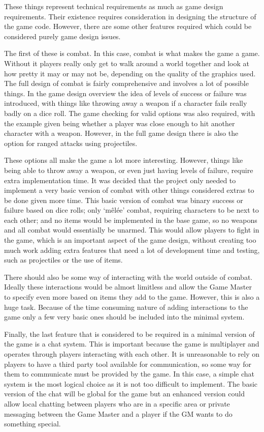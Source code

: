 These things represent technical requirements as much as game design requirements. Their existence requires consideration in designing the structure of the game code. However, there are some other features required which could be considered purely game design issues.

The first of these is combat. In this case, combat is what makes the game a game. Without it players really only get to walk around a world together and look at how pretty it may or may not be, depending on the quality of the graphics used. The full design of combat is fairly comprehensive and involves a lot of possible things. In the game design overview the idea of levels of success or failure was introduced, with things like throwing away a weapon if a character fails really badly on a dice roll. The game checking for valid options was also required, with the example given being whether a player was close enough to hit another character with a weapon. However, in the full game design there is also the option for ranged attacks using projectiles.

These options all make the game a lot more interesting. However, things like being able to throw away a weapon, or even just having levels of failure, require extra implementation time. It was decided that the project only needed to implement a very basic version of combat with other things considered extras to be done given more time. This basic version of combat was binary success or failure based on dice rolls; only `mêlée' combat, requiring characters to be next to each other; and no items would be implemented in the base game, so no weapons and all combat would essentially be unarmed. This would allow players to fight in the game, which is an important aspect of the game design, without creating too much work adding extra features that need a lot of development time and testing, such as projectiles or the use of items.

There should also be some way of interacting with the world outside of combat. Ideally these interactions would be almost limitless and allow the Game Master to specify even more based on items they add to the game. However, this is also a huge task. Because of the time consuming nature of adding interactions to the game only a few very basic ones should be included into the minimal system.

Finally, the last feature that is considered to be required in a minimal version of the game is a chat system. This is important because the game is multiplayer and operates through players interacting with each other. It is unreasonable to rely on players to have a third party tool available for communication, so some way for them to communicate must be provided by the game. In this case, a simple chat system is the most logical choice as it is not too difficult to implement. The basic version of the chat will be global for the game but an enhanced version could allow local chatting between players who are in a specific area or private messaging between the Game Master and a player if the GM wants to do something special.

